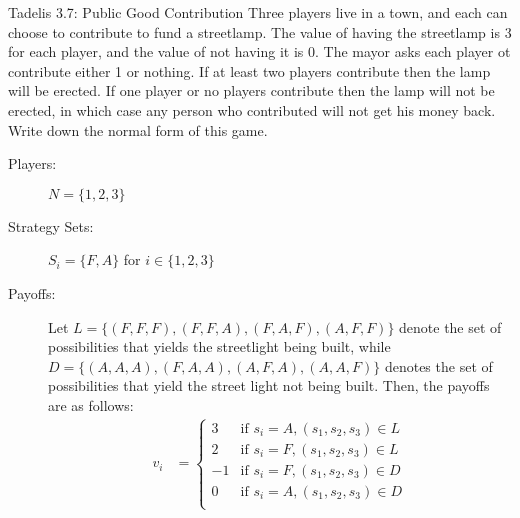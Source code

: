 \documentclass[10pt]{extarticle}
\title{}
\author{Avinash Iyer}
\date{}
\begin{document}
  \renewcommand{\arraystretch}{1.5}
  \begin{problem}{Tadelis 3.7: Public Good Contribution}
    Three players live in a town, and each can choose to contribute to fund a streetlamp. The value of having the streetlamp is $3$ for each player, and the value of not having it is 0. The mayor asks each player ot contribute either 1 or nothing. If at least two players contribute then the lamp will be erected. If one player or no players contribute then the lamp will not be erected, in which case any person who contributed will not get his money back. Write down the normal form of this game.
    \tcblower
    \begin{description}
      \item[Players:] $N = \{1,2,3\}$
      \item[Strategy Sets:] $S_i = \{F,A\}$ for $i\in \{1,2,3\}$
      \item[Payoffs:] Let $L = \{(F,F,F),(F,F,A),(F,A,F),(A,F,F)\}$ denote the set of possibilities that yields the streetlight being built, while $D = \{(A,A,A),(F,A,A),(A,F,A),(A,A,F)\}$ denotes the set of possibilities that yield the street light not being built. Then, the payoffs are as follows:
        \begin{align*}
          v_i &= \begin{cases}
            3 &\textrm{if } s_i = A,(s_1,s_2,s_3)\in L\\
            2 &\textrm{if } s_i = F,(s_1,s_2,s_3)\in L \\
            -1 &\textrm{if } s_i=F,(s_1,s_2,s_3)\in D\\
            0 &\textrm{if } s_i=A,(s_1,s_2,s_3)\in D\\
          \end{cases}
        \end{align*}
    \end{description}
  \end{problem}
\end{document}
